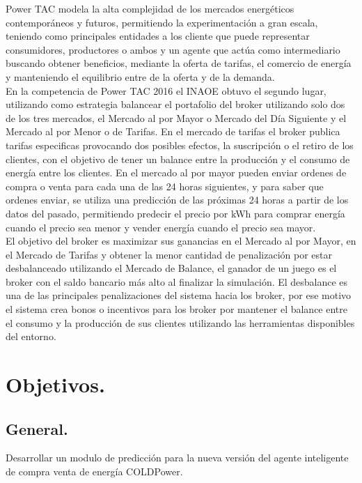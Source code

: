 Power TAC modela la alta complejidad de los mercados energéticos contemporáneos y futuros, permitiendo la experimentación a gran escala, teniendo como principales entidades a los cliente que puede representar consumidores,  productores o ambos y un agente que actúa como intermediario buscando obtener beneficios, mediante la oferta de tarifas, el comercio de energía y manteniendo el equilibrio entre de la oferta y de la demanda.
\\
 
En la competencia de Power TAC 2016 el INAOE obtuvo el segundo lugar, utilizando como estrategia balancear el portafolio del broker utilizando solo dos de los tres mercados, el Mercado al por Mayor o Mercado del Día Siguiente y el Mercado al por Menor o de Tarifas. 
En el mercado de tarifas el broker publica tarifas especificas provocando dos posibles efectos, la suscripción o el retiro de los clientes, con el objetivo de tener un balance entre la producción y el consumo de energía entre los clientes. 
En el mercado al por mayor pueden enviar ordenes de compra o venta para cada una de las 24 horas siguientes, y para saber que ordenes enviar, se utiliza una predicción de las próximas 24 horas a partir de los datos del pasado, permitiendo predecir el precio por kWh para comprar energía cuando el precio sea menor y vender energía cuando el precio sea mayor.
\\
 
El objetivo del broker es maximizar sus ganancias en el  Mercado al por Mayor, en el Mercado de Tarifas y obtener la menor cantidad de penalización por estar desbalanceado utilizando el Mercado de Balance, el ganador de un juego es el broker con el saldo bancario más alto al finalizar la simulación. 
El desbalance es una de las principales penalizaciones del sistema hacia los broker, por ese motivo el sistema crea bonos o incentivos para los broker por mantener el balance entre el consumo y la producción de sus clientes utilizando las herramientas disponibles del entorno.

\section{Objetivos.}
\subsection{General.}
Desarrollar un modulo de predicción para la nueva versión del agente inteligente de compra venta de energía COLDPower.
